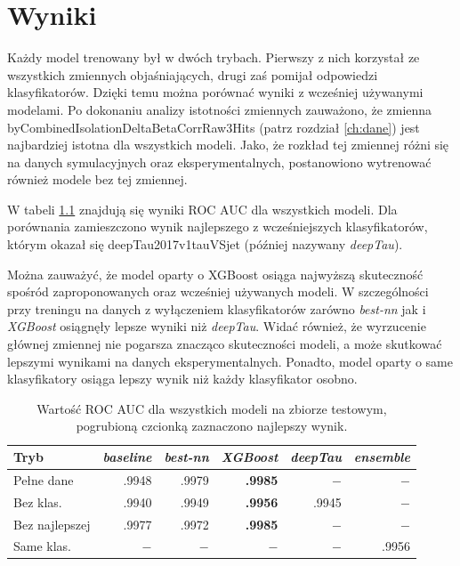 \documentclass{pracalicmgr}
\begin{document}
    \chapter{Wyniki}
    Każdy model trenowany był w dwóch trybach. Pierwszy z nich korzystał ze wszystkich zmiennych objaśniających, drugi zaś pomijał odpowiedzi klasyfikatorów. Dzięki temu można porównać wyniki z wcześniej używanymi modelami. Po dokonaniu analizy istotności zmiennych zauważono, że zmienna byCombinedIsolationDeltaBetaCorrRaw3Hits (patrz rozdział \ref{ch:dane}) jest najbardziej istotna dla wszystkich modeli. Jako, że rozkład tej zmiennej różni się na danych symulacyjnych oraz eksperymentalnych, postanowiono wytrenować również modele bez tej zmiennej.
    
	W tabeli \ref{tab:wyniki} znajdują się wyniki ROC AUC dla wszystkich modeli. Dla porównania zamieszczono wynik najlepszego z wcześniejszych klasyfikatorów, którym okazał się deepTau2017v1tauVSjet (później nazywany \textit{deepTau}). 
	
	Można zauważyć, że model oparty o XGBoost osiąga najwyższą skuteczność spośród zaproponowanych oraz wcześniej używanych modeli. W szczególności przy treningu na danych z wyłączeniem klasyfikatorów zarówno \textit{best-nn} jak i \textit{XGBoost} osiągnęły lepsze wyniki niż \textit{deepTau}. Widać również, że wyrzucenie głównej zmiennej nie pogarsza znacząco skuteczności modeli, a może skutkować lepszymi wynikami na danych eksperymentalnych. Ponadto, model oparty o same klasyfikatory osiąga lepszy wynik niż każdy klasyfikator osobno.
	
	
	\begin{table}[H]
	\centering
	\caption{Wartość ROC AUC dla wszystkich modeli na zbiorze testowym, pogrubioną czcionką zaznaczono najlepszy wynik.}
	\label{tab:wyniki}
	\begin{tabular}{lrrrrr}
	\toprule
	Tryb & \textit{baseline} & \textit{best-nn} & \textit{XGBoost} & \textit{deepTau} & \textit{ensemble} \\
	\midrule
	Pełne dane & .9948 & .9979 & \textbf{.9985} & $-$ & $-$ \\
	Bez klas. & .9940 & .9949 & \textbf{.9956} & .9945 & $-$  \\
	Bez najlepszej & .9977 & .9972 & \textbf{.9985} & $-$ & $-$ \\
	Same klas. & $-$ & $-$ & $-$ & $-$ & .9956 \\
	\bottomrule
	\end{tabular}
	\end{table}
\end{document}
